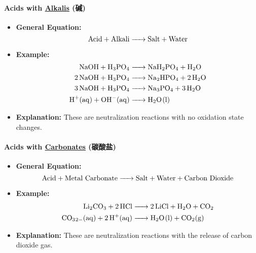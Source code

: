 \paragraph{Acids with \underline{Alkalis} (碱)}
\begin{itemize}
    \item \textbf{General Equation:}
    \begin{equation}
        \ce{\text{Acid} + \text{Alkali} -> \text{Salt} + \text{Water}}
    \end{equation}
    \item \textbf{Example:}
    \begin{equation}
        \begin{split}
            \ce{NaOH +H3PO4 &-> NaH2PO4 + H2O}\\
            \ce{2NaOH + H3PO4 &-> Na2HPO4 + 2H2O}\\
            \ce{3NaOH + H3PO4 &-> Na3PO4 + 3H2O}\\
            \ce{H+(aq) + OH-(aq) &-> H2O(l)}
        \end{split}
    \end{equation}
    \item \textbf{Explanation:} These are neutralization reactions with no oxidation state changes.
\end{itemize}

\paragraph{Acids with \underline{Carbonates} (碳酸盐)}
\begin{itemize}
    \item \textbf{General Equation:}
    \begin{equation}
        \ce{\text{Acid} + \text{Metal Carbonate} -> \text{Salt} + \text{Water} + \text{Carbon Dioxide}}
    \end{equation}
    \item \textbf{Example:}
    \begin{equation}
        \begin{split}
            \ce{Li2CO3 + 2HCl &-> 2LiCl + H2O + CO2}\\
            \ce{CO3_{2-}(aq) + 2H+(aq) &-> H2O(l) + CO2(g)}
        \end{split}
    \end{equation}
    \item \textbf{Explanation:} These are neutralization reactions with the release of carbon dioxide gas.
\end{itemize}

